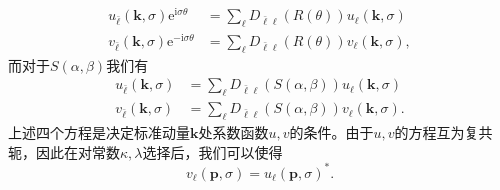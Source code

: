 \begin{equation}
	\begin{aligned}
		u_{\bar{\ell }}(\boldsymbol{k} ,\sigma )\mathrm{e}^{\mathrm{i} \sigma \theta } & =\sum _{\ell } D_{\bar{\ell } \ell }( R( \theta )) u_{\ell }(\boldsymbol{k} ,\sigma )\\
		v_{\bar{\ell }}(\boldsymbol{k} ,\sigma )\mathrm{e}^{-\mathrm{i} \sigma \theta } & =\sum _{\ell } D_{\bar{\ell } \ell }( R( \theta )) v_{\ell }(\boldsymbol{k} ,\sigma ) ,
	\end{aligned}
	\label{eq:6.40}
\end{equation}
而对于$S( \alpha ,\beta )$我们有
\begin{equation}
	\begin{aligned}
		u_{\bar{\ell }}(\boldsymbol{k} ,\sigma ) & =\sum _{\ell } D_{\bar{\ell } \ell }( S( \alpha ,\beta )) u_{\ell }(\boldsymbol{k} ,\sigma )\\
		v_{\bar{\ell }}(\boldsymbol{k} ,\sigma ) & =\sum _{\ell } D_{\bar{\ell } \ell }( S( \alpha ,\beta )) v_{\ell }(\boldsymbol{k} ,\sigma ) .
	\end{aligned}
	\label{eq:6.41}
\end{equation}
上述四个方程是决定标准动量$\boldsymbol{k}$处系数函数$u,v$的条件。由于$u,v$的方程互为复共轭，因此在对常数$\kappa ,\lambda $选择后，我们可以使得
\begin{equation*}
	v_{\ell }(\boldsymbol{p} ,\sigma ) =u_{\ell }(\boldsymbol{p} ,\sigma )^{*} .
\end{equation*}


